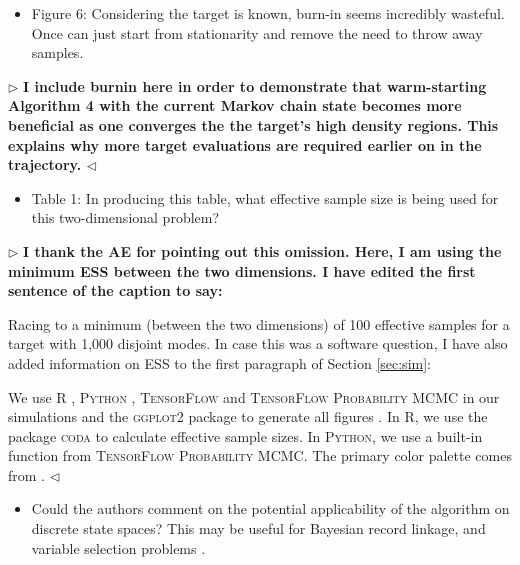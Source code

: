 \documentclass[12pt]{article}
\newenvironment{reply}{$\triangleright$\bfseries}{$\triangleleft$}
\renewenvironment{quote}
               {\list{}{\rightmargin\leftmargin}%
                \item\relax\normalfont}
               {\endlist}
\begin{document}
\begin{itemize}	
	\item Figure 6: Considering the target is known, burn-in seems incredibly wasteful. Once can just start from stationarity and remove the need to throw away samples.
\end{itemize}

\begin{reply}
	I include burnin here in order to demonstrate that warm-starting Algorithm 4 with the current Markov chain state becomes more beneficial as one converges the the target's high density regions. This explains why more target evaluations are required earlier on in the trajectory.
\end{reply}

\begin{itemize}	
	\item Table 1: In producing this table, what effective sample size is being used for this two-dimensional problem?
\end{itemize}

\begin{reply}
	I thank the AE for pointing out this omission. Here, I am using the minimum ESS between the two dimensions.  I  have edited the first sentence of the caption to say:
	\begin{quote}
		Racing to a minimum (between the two dimensions) of 100 effective samples for a target with 1,000 disjoint modes. 
	\end{quote}
 In case this was a software question, I have also added information on ESS to the first paragraph of Section \ref{sec:sim}:
 \begin{quote}
We use \textsc{R} \citep{rlang}, \textsc{Python} \citep{vanrossum1995python}, \textsc{TensorFlow} \citep{abadi2016tensorflow} and  \textsc{TensorFlow Probability MCMC} \citep{lao2020tfp} in our simulations and the \textsc{ggplot2} package to generate all figures \citep{ggplot}.   In \textsc{R}, we use the package \textsc{coda} \citep{coda} to calculate effective sample sizes.  In \textsc{Python}, we use a built-in function from \textsc{TensorFlow Probability MCMC}.  The primary color palette comes from \citet{wes}.
 \end{quote}
\end{reply}

\begin{itemize}	
	\item Could the authors comment on the potential applicability of the algorithm on discrete state spaces? This may be useful for Bayesian record linkage, and variable selection problems \citep{zanella2020informed}.
\end{itemize}
\end{document}
